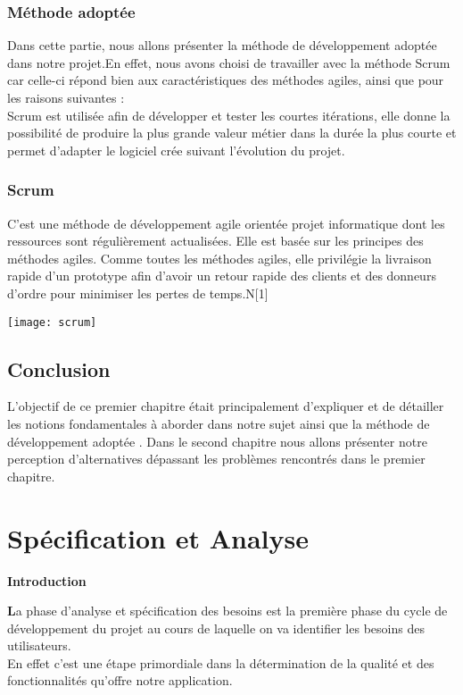 \documentclass[a4paper,12pt,oneside]{report}
\begin{document}
\subsection{Méthode adoptée}
Dans cette partie, nous allons présenter la méthode de développement adoptée dans notre projet.En effet, nous avons choisi de travailler avec la méthode Scrum  car celle-ci répond bien aux caractéristiques des méthodes agiles, ainsi que pour les raisons suivantes : \\
 Scrum est utilisée afin de développer et tester les courtes itérations, elle donne la possibilité de produire la plus grande valeur métier dans la durée la plus courte et permet d'adapter le logiciel crée suivant l'évolution du projet.
\subsection{Scrum}
C'est une méthode de développement agile orientée projet informatique dont les ressources sont régulièrement actualisées. Elle est basée sur les principes des méthodes agiles. Comme toutes les méthodes agiles, elle privilégie la livraison rapide d'un prototype afin d'avoir un retour rapide des clients et des donneurs d'ordre pour minimiser les pertes de temps.N[1]

\begin{center}
\texttt{[image: scrum]}

\label{fig1}
\end{center}

  \section{Conclusion}
  L'objectif de ce premier chapitre était principalement d'expliquer et de détailler les notions fondamentales à aborder dans notre sujet ainsi que la méthode de développement adoptée .
  Dans le second chapitre nous allons présenter notre perception d'alternatives dépassant les problèmes rencontrés dans le premier chapitre.

  
  \chapter{Spécification et Analyse}
  \begin{flushleft}
  \textbf\Huge\bf Introduction
  \end{flushleft}
  
  \textbf La phase d'analyse et spécification des besoins est la première phase du cycle de développement du projet au cours de laquelle on va identifier les besoins des utilisateurs.\\
  En effet c'est une étape primordiale dans la détermination de la qualité et des fonctionnalités qu'offre notre application.
\end{document}
